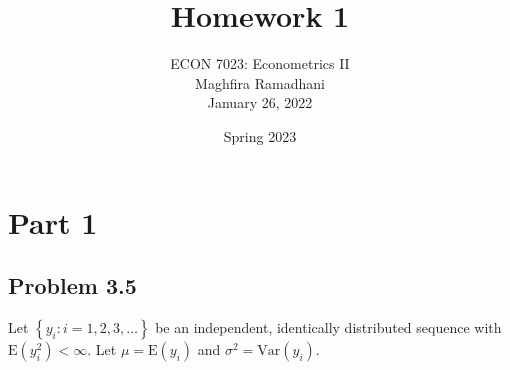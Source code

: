 \documentclass[10pt]{article}
\newcommand{\E}{\text{E}}
\newcommand{\V}{\text{Var}}
\begin{document}
 
\title{Homework 1}
\author{ECON 7023: Econometrics II\\
Maghfira Ramadhani\\
January 26, 2022}
\date{Spring 2023}
\maketitle

\section*{Part 1}
\subsection*{Problem 3.5}
Let $\left\{y_i:i=1,2,3,\ldots\right\}$ be an independent, identically distributed sequence with $\E(y_i^2)<\infty$. Let $\mu=\E(y_i)$ and $\sigma^2=\V(y_i).$
\end{document}

